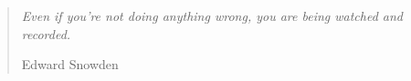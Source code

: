 \vspace*{\fill}
\thispagestyle{empty}
\begin{quotation}
    \em
    Even if you're not doing anything wrong, you are being watched and recorded.

    \medskip
\raggedleft{}
    Edward Snowden
\end{quotation}
\vspace*{\fill}
